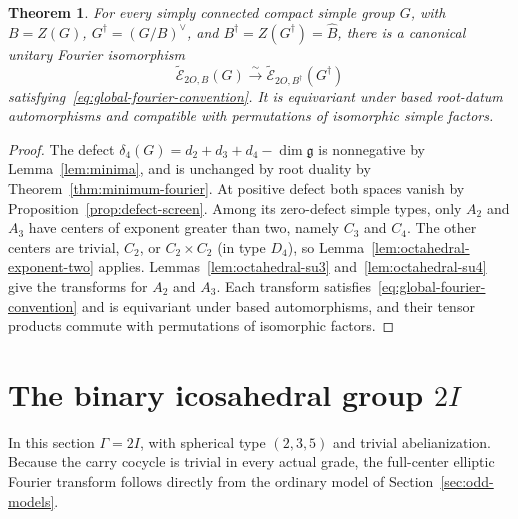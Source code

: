 \documentclass[11pt,a4paper,reqno]{amsart}
\theoremstyle{plain}
\newtheorem{theorem}{Theorem}[section]
\theoremstyle{definition}
\theoremstyle{remark}
\numberwithin{equation}{section}
\newcommand{\fg}{\mathfrak g}
\newcommand{\wtE}{\widetilde{\mathcal E}}
\begin{document}
\begin{theorem}\label{thm:octahedral-fourier}
For every simply connected compact simple group $G$, with $B=Z(G)$, $G^\dagger=(G/B)^\vee$, and $B^\dagger=Z(G^\dagger)=\widehat B$, there is a canonical unitary Fourier isomorphism
\[
\wtE_{2O,B}(G)\xrightarrow{\sim}\wtE_{2O,B^\dagger}(G^\dagger)
\]
satisfying~\eqref{eq:global-fourier-convention}. It is equivariant under based root-datum automorphisms and compatible with permutations of isomorphic simple factors.
\end{theorem}
\begin{proof}
The defect $\delta_4(G)=d_2+d_3+d_4-\dim\fg$ is nonnegative by Lemma~\ref{lem:minima}, and is unchanged by root duality by Theorem~\ref{thm:minimum-fourier}. At positive defect both spaces vanish by Proposition~\ref{prop:defect-screen}. Among its zero-defect simple types, only $A_2$ and $A_3$ have centers of exponent greater than two, namely $C_3$ and $C_4$. The other centers are trivial, $C_2$, or $C_2\times C_2$ (in type $D_4$), so Lemma~\ref{lem:octahedral-exponent-two} applies. Lemmas~\ref{lem:octahedral-su3} and~\ref{lem:octahedral-su4} give the transforms for $A_2$ and $A_3$. Each transform satisfies~\eqref{eq:global-fourier-convention} and is equivariant under based automorphisms, and their tensor products commute with permutations of isomorphic factors.
\end{proof}

\section{The binary icosahedral group \texorpdfstring{$2I$}{2I}}\label{sec:full-reciprocity}

In this section $\Gamma=2I$, with spherical type $(2,3,5)$ and trivial abelianization. Because the carry cocycle is trivial in every actual grade, the full-center elliptic Fourier transform follows directly from the ordinary model of Section~\ref{sec:odd-models}.
\end{document}
